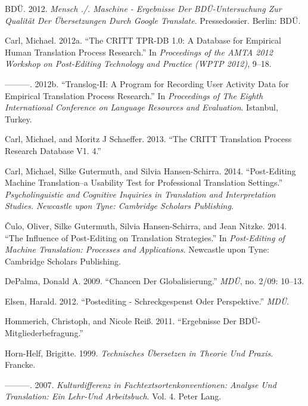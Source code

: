 \documentclass[output=paper]{langsci/langscibook}
\begin{document}
BDÜ. 2012. \textit{Mensch ./. Maschine - Ergebnisse Der BDÜ-Untersuchung Zur Qualität Der Übersetzungen Durch Google Translate}. Pressedossier. Berlin: BDÜ.



Carl, Michael. 2012a. “The CRITT TPR-DB 1.0: A Database for Empirical Human Translation Process Research.” In \textit{Proceedings of the AMTA 2012 Workshop on Post-Editing Technology and Practice (WPTP 2012)}, 9–18.



———. 2012b. “Translog-II: A Program for Recording User Activity Data for Empirical Translation Process Research.” In \textit{Proceedings of The Eighth International Conference on Language Resources and Evaluation}. Istanbul, Turkey.



Carl, Michael, and Moritz J Schaeffer. 2013. “The CRITT Translation Process Research Database V1. 4.”



Carl, Michael, Silke Gutermuth, and Silvia Hansen-Schirra. 2014. “Post-Editing Machine Translation–a Usability Test for Professional Translation Settings.” \textit{Psycholinguistic and Cognitive Inquiries in Translation and Interpretation Studies. Newcastle upon Tyne: Cambridge Scholars Publishing}.



Čulo, Oliver, Silke Gutermuth, Silvia Hansen-Schirra, and Jean Nitzke. 2014. “The Influence of Post-Editing on Translation Strategies.” In \textit{Post-Editing of Machine Translation: Processes and Applications}. Newcastle upon Tyne: Cambridge Scholars Publishing.



DePalma, Donald A. 2009. “Chancen Der Globalisierung.” \textit{MDÜ}, no. 2/09: 10–13.



Elsen, Harald. 2012. “Postediting - Schreckgespenst Oder Perspektive.” \textit{MDÜ}.



Hommerich, Christoph, and Nicole Reiß. 2011. “Ergebnisse Der BDÜ-Mitgliederbefragung.”



Horn-Helf, Brigitte. 1999. \textit{Technisches Übersetzen in Theorie Und Praxis}. Francke.



———. 2007. \textit{Kulturdifferenz in Fachtextsortenkonventionen: Analyse Und Translation: Ein Lehr-Und Arbeitsbuch}. Vol. 4. Peter Lang.
\end{document}
